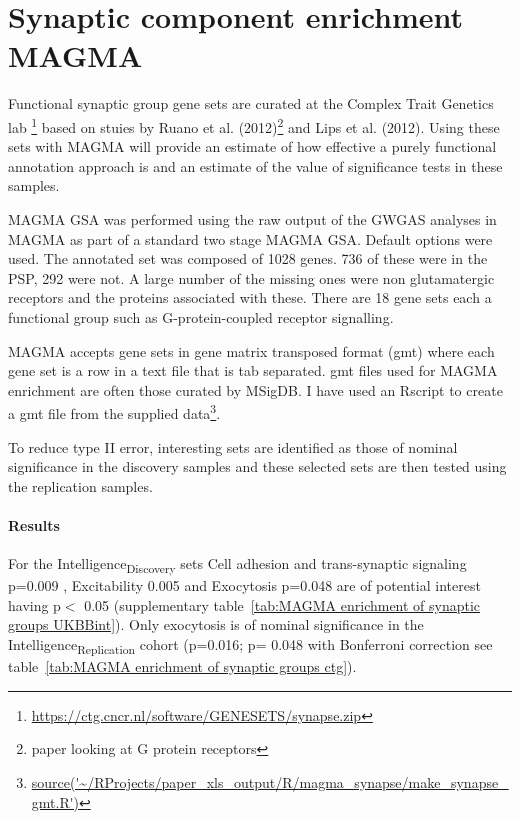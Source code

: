 \clearpage
\section{Synaptic component enrichment MAGMA}
\label{Synaptic component enrichment MAGMA}

Functional synaptic group gene sets are curated  at the Complex Trait Genetics lab \footnote{\url{https://ctg.cncr.nl/software/GENESETS/synapse.zip}} based on stuies by Ruano et al. (2012)\cite{ruano2010functional}\footnote{paper looking at G protein receptors} and Lips et al. (2012)\cite{lips2012functional}. Using these sets with MAGMA will provide an estimate of how effective a purely functional annotation approach is and an estimate of the value of significance tests in these samples. 

MAGMA GSA was performed using the raw output of the GWGAS analyses in MAGMA as part of a standard two stage MAGMA GSA. Default options were used.
The annotated set was composed of 1028 genes. 736 of these were in the PSP, 292 were not. A large number of the missing ones were non glutamatergic receptors and the  proteins associated with these. There are 18 gene sets each a functional group such as G-protein-coupled receptor signalling.

MAGMA accepts gene sets in gene matrix transposed format (gmt) where each gene set is a row in a text file that is tab separated. gmt files used for MAGMA enrichment are often those curated by MSigDB. I have used an Rscript to create a gmt file from the supplied data\footnote{\url{source('~/RProjects/paper_xls_output/R/magma_synapse/make_synapse_gmt.R')}}.

To reduce type II error, interesting sets are identified as those of nominal significance in the discovery samples and these selected sets are then tested using the replication samples. 

\paragraph{Results} For the Intelligence\textsubscript{Discovery} sets Cell adhesion and trans-synaptic signaling p=0.009 , Excitability 0.005 and Exocytosis p=0.048 are of potential interest having p$<$ 0.05 (supplementary table~\ref{tab:MAGMA enrichment of synaptic groups UKBBint}). Only exocytosis is of nominal significance in the Intelligence\textsubscript{Replication} cohort (p=0.016; p= 0.048 with Bonferroni correction see  table~\ref{tab:MAGMA enrichment of synaptic groups ctg}). 

